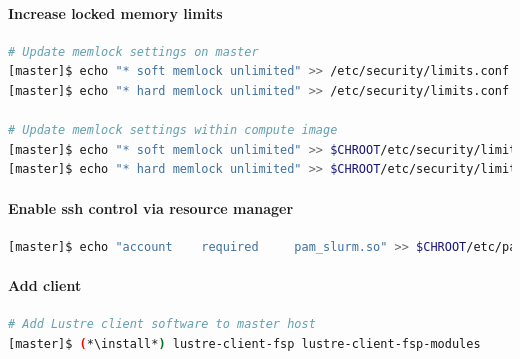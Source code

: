 \documentclass[letterpaper]{article}
\newcommand{\baseOS}{CentOS7.1}
\newcommand{\install}{yum -y install}
\begin{document}
\paragraph{Increase locked memory limits}

 

\begin{lstlisting}[language=bash,keywords={},upquote=true]
# Update memlock settings on master
[master]$ echo "* soft memlock unlimited" >> /etc/security/limits.conf
[master]$ echo "* hard memlock unlimited" >> /etc/security/limits.conf

# Update memlock settings within compute image
[master]$ echo "* soft memlock unlimited" >> $CHROOT/etc/security/limits.conf
[master]$ echo "* hard memlock unlimited" >> $CHROOT/etc/security/limits.conf
\end{lstlisting}


\paragraph{Enable ssh control via resource manager} 



\begin{lstlisting}[language=bash,keywords={},upquote=true]
[master]$ echo "account    required     pam_slurm.so" >> $CHROOT/etc/pam.d/sshd
\end{lstlisting}

\paragraph{Add \Lustre{} client} \label{sec:lustre_client}



\begin{lstlisting}[language=bash,keywords={},upquote=true]
# Add Lustre client software to master host
[master]$ (*\install*) lustre-client-fsp lustre-client-fsp-modules
\end{lstlisting}
\end{document}

